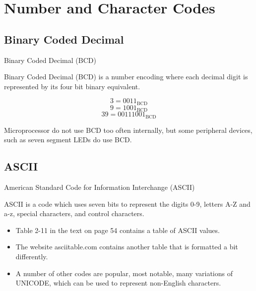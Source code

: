 \section {Number and Character Codes}

\subsection{Binary Coded Decimal}

\begin{frame}{Binary Coded Decimal (BCD)}
  \begin{definition}
    \alert{Binary Coded Decimal} (BCD) is a number encoding where each decimal digit is represented by its four bit binary equivalent.
  \end{definition}
  \begin{example}
    $$3 = 0011_{\text{BCD}}$$
    $$9 = 1001_{\text{BCD}}$$
    $$39 = 00111001_{\text{BCD}}$$
  \end{example}
\end{frame}

Microprocessor do not use BCD too often internally, but some peripheral devices, such as seven segment LEDs do use BCD.

\subsection{ASCII}

\begin{frame}{American Standard Code for Information Interchange (ASCII)}
  \begin{definition}
    \alert{ASCII} is a code which uses seven bits to represent the digits 0-9, letters A-Z and a-z, special characters, and control characters.
  \end{definition}
  \begin{itemize}
    \item Table 2-11 in the text on page 54 contains a table of ASCII values.
    \item The website asciitable.com contains another table that is formatted a bit differently.
    \item A number of other codes are popular, most notable, many variations of UNICODE, which can be used to represent non-English characters.
  \end{itemize}
\end{frame}


